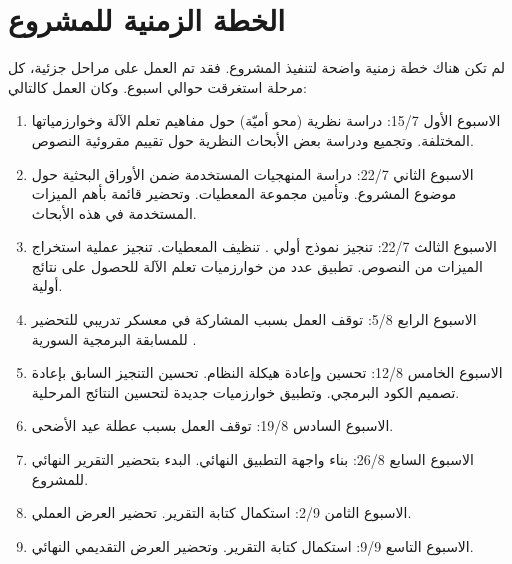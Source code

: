 \section{الخطة الزمنية للمشروع}
لم تكن هناك خطة زمنية واضحة لتنفيذ المشروع.
فقد تم العمل على مراحل جزئية، كل مرحلة استغرقت حوالي اسبوع.
وكان العمل كالتالي:
\begin{enumerate}
	\item 
	الاسبوع الأول 15/7:
	دراسة نظرية (محو أميّة) حول مفاهيم تعلم الآلة وخوارزمياتها المختلفة.
	وتجميع ودراسة بعض الأبحاث النظرية حول تقييم مقروئية النصوص.
	\item
	الاسبوع الثاني 22/7:
	دراسة المنهجيات المستخدمة ضمن الأوراق البحثية حول موضوع المشروع.
	وتأمين مجموعة المعطيات.
	وتحضير قائمة بأهم الميزات المستخدمة في هذه الأبحاث.
	\item
	الاسبوع الثالث 22/7:
	تنجيز نموذج أولي .
	تنظيف المعطيات.
	تنجيز عملية استخراج الميزات من النصوص.
	تطبيق عدد من خوارزميات تعلم الآلة للحصول على نتائج أولية.
	\item
	الاسبوع الرابع 5/8:
	توقف العمل بسبب المشاركة في معسكر تدريبي للتحضير للمسابقة البرمجية السورية .
	\item
	الاسبوع الخامس 12/8:
	تحسين وإعادة هيكلة النظام.
	تحسين التنجيز السابق بإعادة تصميم الكود البرمجي.
	وتطبيق خوارزميات جديدة لتحسين النتائج المرحلية.
	\item
	الاسبوع السادس 19/8:
	توقف العمل بسبب عطلة عيد الأضحى.
	\item
	الاسبوع السابع 26/8:
	بناء واجهة التطبيق النهائي.
	البدء بتحضير التقرير النهائي للمشروع.
	\item
	الاسبوع الثامن 2/9:
	استكمال كتابة التقرير.
	تحضير العرض العملي.
	\item
	الاسبوع التاسع 9/9:
	استكمال كتابة التقرير.
	وتحضير العرض التقديمي النهائي.
\end{enumerate}








